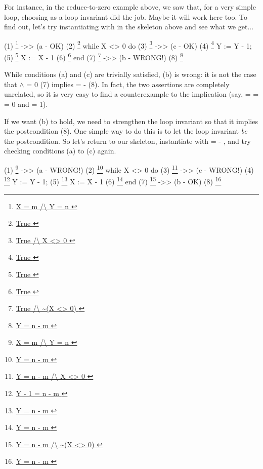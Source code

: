 \documentclass[12pt]{report}
\begin{document}
    For instance, in the reduce-to-zero example above, we saw that,
    for a very simple loop, choosing  as a loop invariant did the
    job.  Maybe it will work here too.  To find out, let's try
    instantiating  with  in the skeleton above and
    see what we get...


        (1)    \footnote{\url{ X = m /\ Y = n }} ->>                    (a - OK)
        (2)    \footnote{\url{ True }}
                 while X <> 0 do
        (3)                   \footnote{\url{ True /\ X <> 0 }} ->>     (c - OK)
        (4)                   \footnote{\url{ True }}
                   Y := Y - 1;
        (5)                   \footnote{\url{ True }}
                   X := X - 1
        (6)                   \footnote{\url{ True }}
                 end
        (7)    \footnote{\url{ True /\ ~(X <> 0) }} ->>                 (b - WRONG!)
        (8)    \footnote{\url{ Y = n - m }}


    While conditions (a) and (c) are trivially satisfied,
    (b) is wrong: it is not the case that  \ensuremath{\land}  = 0 (7)
    implies  =  -  (8).  In fact, the two assertions are
    completely unrelated, so it is very easy to find a counterexample
    to the implication (say,  =  =  = 0 and  = 1).


    If we want (b) to hold, we need to strengthen the loop invariant so
    that it implies the postcondition (8).  One simple way to do
    this is to let the loop invariant \textit{be} the postcondition.  So let's
    return to our skeleton, instantiate  with  =  - , and
    try checking conditions (a) to (c) again.


    (1)    \footnote{\url{ X = m /\ Y = n }} ->>                        (a - WRONG!)
    (2)    \footnote{\url{ Y = n - m }}
             while X <> 0 do
    (3)                     \footnote{\url{ Y = n - m /\ X <> 0 }} ->>  (c - WRONG!)
    (4)                     \footnote{\url{ Y - 1 = n - m }}
               Y := Y - 1;
    (5)                     \footnote{\url{ Y = n - m }}
               X := X - 1
    (6)                     \footnote{\url{ Y = n - m }}
             end
    (7)    \footnote{\url{ Y = n - m /\ ~(X <> 0) }} ->>                (b - OK)
    (8)    \footnote{\url{ Y = n - m }}
\end{document}

